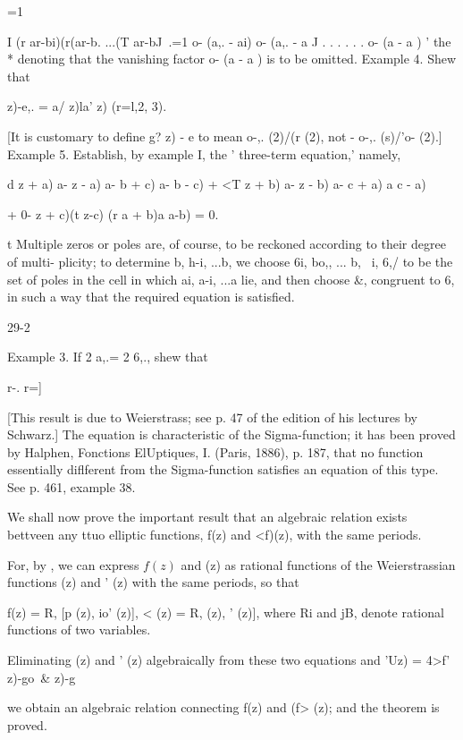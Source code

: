 {=1

I (r ar-bi)(r(ar-b. ...(T ar-bJ \,.=1 o- (a,. - ai) o- (a,. - a J . .
. . . . o- (a - a ) ' the * denoting that the vanishing factor o- (a -
a ) is to be omitted. Example 4. Shew that

  z)-e,. = a/ z)la' z) (r=l,2, 3).

[It is customary to define g? z) - e to mean o-,. (2)/(r (2), not -
o-,. (s)/'o- (2).] Example 5. Establish, by example I, the '
three-term equation,' namely,

d z + a) a- z - a) a- b + c) a- b - c) + <T z + b) a- z - b) a- c + a)
a c - a)

+ 0- z + c)(t z-c) (r a + b)a a-b) = 0.

t Multiple zeros or poles are, of course, to be reckoned according to
their degree of multi- plicity; to determine b, h-i, ...b, we
choose 6i, bo,, ... b, \ i, 6,/ to be the set of poles in the cell
in which ai, a-i, ...a lie, and then choose \&, congruent to 6, in
such a way that the required equation is satisfied.

29-2

Example 3. If 2 a,.= 2 6,., shew that

r-. r=]

%
%

[This result is due to Weierstrass; see p. 47 of the edition of his
lectures by Schwarz.] The equation is characteristic of the
Sigma-function; it has been proved by Halphen, Fonctions ElUptiques,
I. (Paris, 1886), p. 187, that no function essentially diflferent from
the Sigma-function satisfies an equation of this type. See p. 461,
example 38.


We shall now prove the important result that an algebraic relation
exists bettveen any ttuo elliptic functions, f(z) and <f)(z), with the
same periods.

For, by , we can express $f(z)$ and (z) as
rational functions of
the Weierstrassian functions (z) and ' (z) with the same periods, so
that

f(z) = R, [p (z), io' (z)], < (z) = R, (z), ' (z)], where Ri and jB,
denote rational functions of two variables.

Eliminating (z) and ' (z) algebraically from these two equations and
'Uz) = 4>f' z)-go\ \& z)-g

we obtain an algebraic relation connecting f(z) and (f> (z); and the
theorem is proved.

}
